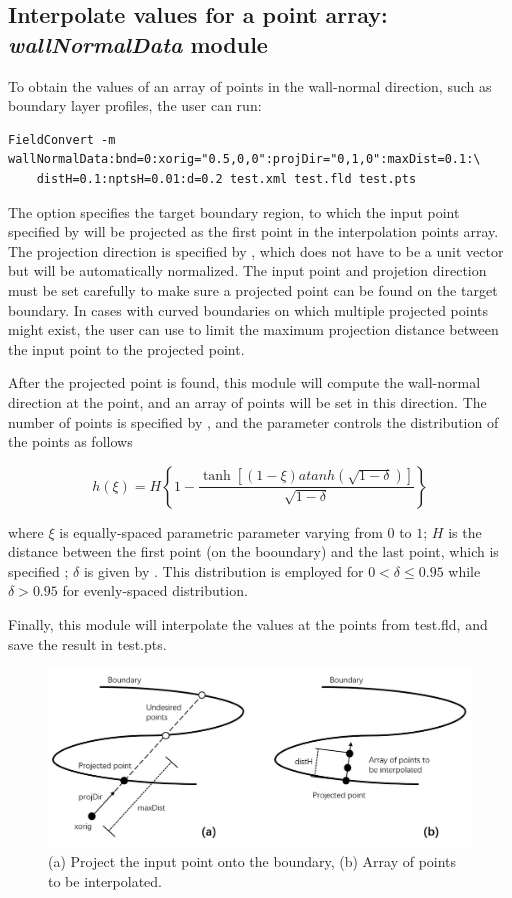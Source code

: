 \subsection{Interpolate values for a point array: 
\textit{wallNormalData} module}
\label{s:utilities:fieldconvert:sub:wallNormalData}
To obtain the values of an array of points in the wall-normal direction, such 
as boundary layer profiles, the user can run:
\begin{lstlisting}[style=BashInputStyle]
FieldConvert -m wallNormalData:bnd=0:xorig="0.5,0,0":projDir="0,1,0":maxDist=0.1:\
    distH=0.1:nptsH=0.01:d=0.2 test.xml test.fld test.pts
\end{lstlisting}
The option  specifies the target boundary region, to which the input 
point specified by \inltt{xorig} will be projected as the first point in 
the interpolation points array. The projection direction is specified by 
\inltt{projDir}, which does not have to be a unit vector but will be 
automatically normalized. The input point and projetion direction must be set 
carefully to make sure a projected point can be found on the target boundary. 
In cases with curved boundaries on which multiple projected points might exist, 
the user can use \inltt{maxDist} to limit the maximum projection distance 
between the input point to the projected point.


After the projected point is found, this module will compute the wall-normal 
direction at the point, and an array of points will be set in this direction.
The number of points is specified by \inltt{nptsH}, and the parameter 
\inltt{d} controls the distribution of the points as follows

\[
h(\xi) = H \left\{1-\frac{\tanh \left[(1-\xi) atanh(\sqrt{1-\delta}) \right]}{\sqrt{1-\delta}} \right\}
\]

where $\xi$ is equally-spaced parametric parameter varying from $0$ to $1$; 
$H$ is the distance between the first point (on the booundary) and the last 
point, which is specified \inltt{distH}; $\delta$ is given by \inltt{d}. This 
distribution is employed for $0 < \delta \le 0.95$ while $\delta > 0.95$ for 
evenly-spaced distribution.

Finally, this module will interpolate the values at the points from test.fld, 
and save the result in test.pts.
%
\begin{figure}[!htbp]
  \begin{center}
    \includegraphics[width = 0.9 \textwidth]{img/module_wallNormalData.jpg}
    \caption{(a) Project the input point onto the boundary, (b) Array of 
    points to be interpolated.}
  \end{center}
\end{figure}

